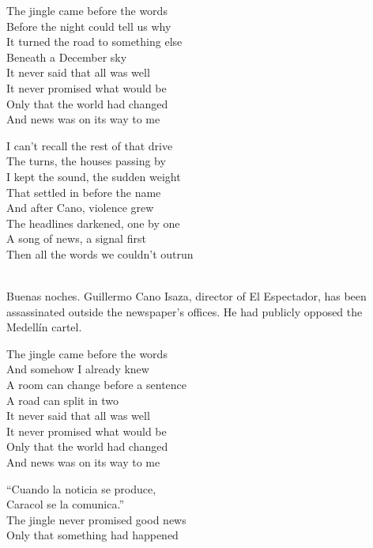\begin{lyrics}
The jingle came before the words\\
Before the night could tell us why\\
It turned the road to something else\\
Beneath a December sky\\
It never said that all was well\\
It never promised what would be\\
Only that the world had changed\\
And news was on its way to me

I can’t recall the rest of that drive\\
The turns, the houses passing by\\
I kept the sound, the sudden weight\\
That settled in before the name\\
And after Cano, violence grew\\
The headlines darkened, one by one\\
A song of news, a signal first\\
Then all the words we couldn’t outrun

\\
Buenas noches. Guillermo Cano Isaza, director of El Espectador, has been assassinated outside the newspaper’s offices. He had publicly opposed the Medellín cartel.

The jingle came before the words\\
And somehow I already knew\\
A room can change before a sentence\\
A road can split in two\\
It never said that all was well\\
It never promised what would be\\
Only that the world had changed\\
And news was on its way to me

“Cuando la noticia se produce,\\
Caracol se la comunica.”\\
The jingle never promised good news\\
Only that something had happened
\end{lyrics}

